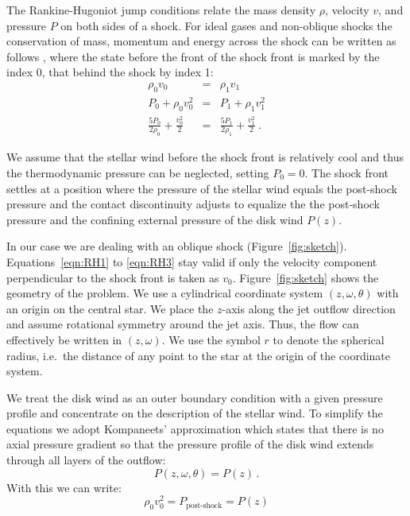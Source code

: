 \documentclass[manuscript]{aastex}
\begin{document}
The Rankine-Hugoniot jump conditions relate the mass density $\rho$, velocity $v$, and pressure $P$ on both sides of a shock. For ideal gases and non-oblique shocks the conservation of mass, momentum and energy across the shock can be written as follows \citep[][chap.~7]{1967pswh.book.....Z}, where the state before the front of the shock front is marked by the index 0, that behind the shock by index 1:
\begin{eqnarray}
\rho_0 v_0 & = & \rho_1 v_1 \label{eqn:RH1}\\
\label{eqn:RH2}P_0+\rho_0 v_0^2 & = & P_1+\rho_1 v_1^2\\
\label{eqn:RH3}\frac{5 P_0}{2\rho_0}+\frac{v_0^2}{2}& = &\frac{5 P_1}{2\rho_1}+\frac{v_1^2}{2} \ .
\end{eqnarray}

We assume that the stellar wind before the shock front is relatively cool and thus the thermodynamic pressure can be neglected, setting $P_0=0$.
The shock front settles at a position where the pressure of the stellar wind equals the post-shock pressure and the contact discontinuity adjusts to equalize the the post-shock pressure and the confining external pressure of the disk wind $P(z)$. 

In our case we are dealing with an oblique shock (Figure~\ref{fig:sketch}). Equations~\ref{eqn:RH1} to \ref{eqn:RH3} stay valid if only the velocity component perpendicular to the shock front is taken as $v_0$. 
Figure~\ref{fig:sketch} shows the geometry of the problem. We use a cylindrical coordinate system $(z, \omega, \theta)$ with an origin on the central star. We place the $z$-axis along the jet outflow direction and assume rotational symmetry around the jet axis. Thus, the flow can effectively be written in $(z,\omega)$. We use the symbol $r$ to denote the spherical radius, i.e.\ the distance of any point to the star at the origin of the coordinate system.

We treat the disk wind as an outer boundary condition with a given pressure profile and concentrate on the description of the stellar wind. To simplify the equations we adopt Kompaneets' approximation \citep{1960SPhD....5...46K} which states that there is no axial pressure gradient so that the pressure profile of the disk wind extends through all layers of the outflow:
\begin{equation}
P(z, \omega, \theta) = P(z)\,.
\end{equation}
With this we can write:
\begin{equation}\label{eqn:Pofz}
\rho_0 v_0^2 = P_{\textrm{post-shock}} = P(z)
\end{equation}
\end{document}
